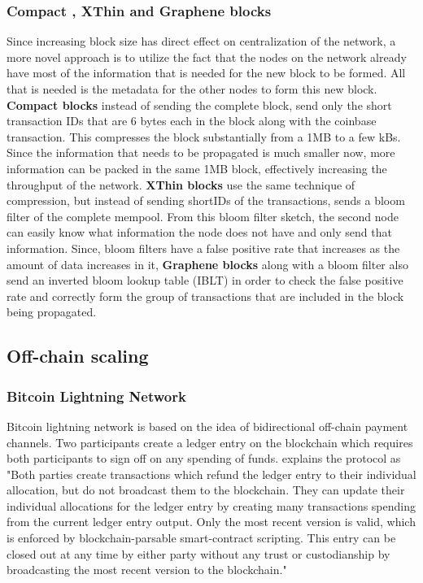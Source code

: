 \documentclass[journal,12pt,onecolumn,draftclsnofoot,]{IEEEtran}
\begin{document}
\subsubsection{Compact \cite{compact}, XThin \cite{xthin} and Graphene blocks
\cite{graphene} }
Since increasing block size has direct effect on centralization of the network,
a more novel approach is to utilize the fact that the nodes on the network
already have most of the information that is needed for the new block to be
formed. All that is needed is the metadata for the other nodes to form this new
block. \textbf{Compact blocks} instead of sending the complete block, send only
the short transaction IDs that are 6 bytes each in the block along with the
coinbase transaction. This compresses the block substantially from a 1MB to a few
kBs. Since the information that needs to be propagated is much smaller now, more
information can be packed in the same 1MB block, effectively increasing the
throughput of the network. \textbf{XThin blocks} use the same technique of
compression, but instead of sending shortIDs of the transactions, sends a bloom
filter of the complete mempool. From this bloom filter sketch, the second node
can easily know what information the node does not have and only send that
information. Since, bloom filters have a false positive rate that increases as
the amount of data increases in it, \textbf{Graphene blocks} along with a bloom
filter also send an inverted bloom lookup table (IBLT) in order to check the
false positive rate and correctly form the group of transactions that are
included in the block being propagated.

\subsection{Off-chain scaling}
\subsubsection{Bitcoin Lightning Network \cite{lightning}}
Bitcoin lightning network is based on the idea of bidirectional off-chain
payment channels. Two participants create a ledger entry on the blockchain which
requires both participants to sign off on any spending of funds.
\cite{lightning} explains the protocol as "Both parties
create transactions which refund the ledger entry to their individual
allocation, but do not broadcast them to the blockchain. They can update their
individual allocations for the ledger entry by creating many transactions
spending from the current ledger entry output. Only the most recent version is
valid, which is enforced by blockchain-parsable smart-contract scripting. This
entry can be closed out at any time by either party without any trust or
custodianship by broadcasting the most recent version to the blockchain."
\end{document}
